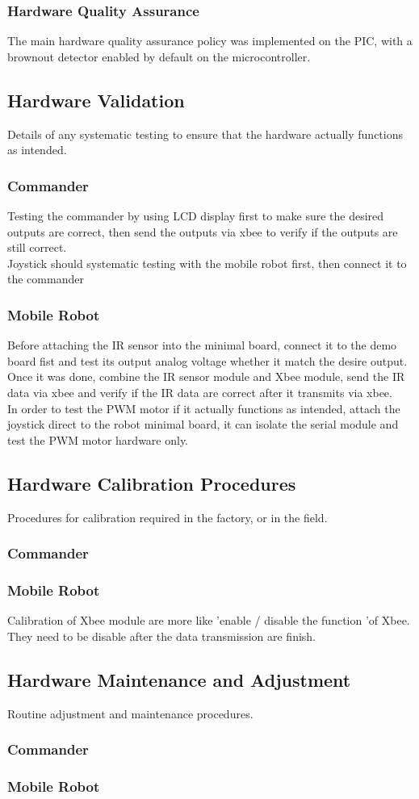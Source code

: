 \documentclass[11pt,a4paper]{article}
\begin{document}
    \subsubsection{Hardware Quality Assurance}
      The main hardware quality assurance policy was implemented on the PIC, with a brownout detector enabled by default on the microcontroller.\\

  \subsection{Hardware Validation}
  Details of any systematic testing to ensure that the hardware actually functions as intended.
    \subsubsection{Commander}
    Testing the commander by using LCD display first to make sure the desired outputs are correct, then send the outputs via xbee to verify if the outputs are still correct. \\
    Joystick should systematic testing with the mobile robot first, then connect it to the commander\\
    \subsubsection{Mobile Robot}
    Before attaching the IR sensor into the minimal board, connect it to the demo board fist and test its output analog  voltage whether it match the desire output. Once it was done, combine the IR sensor module and Xbee module, send the IR data via xbee and verify if the IR data are correct after it transmits via xbee.\\
    In order to test the PWM motor if it actually functions as intended, attach the joystick direct to the robot minimal board, it can isolate the serial module and test the PWM motor hardware only. \\

  \subsection{Hardware Calibration Procedures}
    Procedures for calibration required in the factory, or in the field.
    \subsubsection{Commander}
    \subsubsection{Mobile Robot}
    Calibration of Xbee module are more like 'enable / disable the function 'of Xbee. They need to be disable after the data transmission are finish. 

  \subsection{Hardware Maintenance and Adjustment}
    Routine adjustment and maintenance procedures.
    \subsubsection{Commander}
    \subsubsection{Mobile Robot}
\end{document}
